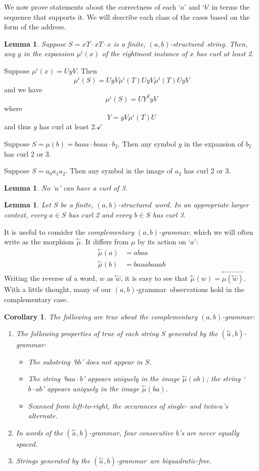 \documentclass[11pt]{article}
\def\emph#1{{\em #1\/}}
\def\term#1{\emph{#1}}
\newcounter{thm}
\newtheorem{corollary}[thm]{Corollary}
\newtheorem{lemma}[thm]{Lemma}
\def\QED{$\checkmark$}
\def\ni{\noindent}
\def\ab{$(a,b)$}
\def\abg{\ab-grammar}
\def\abs{\ab-structured}
\def\la#1{\overset{\leftarrow}{#1}}
\def\lla#1{\overset{\longleftarrow}{#1}}
\def\rmu{\la{\mu}}
\def\rabg{$(\la{a},b)$-grammar}
\def\q#1{`$#1$'}
\def\Proof{\ni{\bf Proof:} }
\begin{document}
We now prove statements about the correctness of each \q{a} and \q{b} in terms
the sequence that supports it.  We will describe each class of the cases
based on the form of the address.

\begin{lemma}\label{lem:curltwo}
Suppose $S=xT\cdot xT\cdot x$ is a finite, \abs\ string.  Then, any $y$ in
the expansion $\mu^i(x)$ of the rightmost instance of $x$ has curl at least 2.
\end{lemma}
\Proof Suppose $\mu^i(x)=UyV$.  Then 
$$\mu^i(S)=UyV\mu^i(T)UyV\mu^i(T)UyV$$
\ni and we have
$$\mu^i(S)=UY^2yV$$
\ni where
$$Y=yV\mu^i(T)U$$
\ni and thus $y$ has curl at least 2.\QED

\ni {\sc Example.}  Suppose $S=\mu(b)=baaa\cdot baaa\cdot b_2$.  Then any symbol
$y$ in the expansion of $b_2$ has curl 2 or 3.

\ni {\sc Example.}  Suppose $S=a_0a_1a_2$.  Then any symbol in the image of $a_2$
has curl 2 or 3.

\begin{lemma}\label{lem:properacurl} No \q{a} can have a curl of 3.
\end{lemma}

\begin{lemma}\label{lem:abcurl}
Let $S$ be a finite, \abs\ word.  In an appropriate larger context, every $a\in S$ has curl 2 and every $b\in S$ has curl 3.
\end{lemma}

It is useful to consider the \term{complementary \abg}, 
which we will often write as the morphism $\rmu$. It differs from $\mu$ by
its action on \q{a}:
\begin{align*}
\rmu(a)&=abaa\\
\rmu(b)&=baaabaaab
\end{align*}
\ni Writing the reverse of a word, $w$ as $\la{w}$, it is easy to see
that $\rmu(w)=\lla{\mu(\la{w})}$.  With a little thought, many of
our \abg\ observations hold in the complementary case.

\begin{corollary}
The following are true about the complementary \abg:
\begin{enumerate}
\item The following properties of true of each string $S$ generated by the
\rabg:
\begin{itemize}
\item The substring \q{bb} does not appear in $S$.
\item The string \q{baa\cdot b} appears uniquely in the image $\rmu(ab)$;
the string \q{b\cdot ab} appears uniquely in the image $\rmu(ba)$.
\item Scanned from left-to-right, the occurances of single- and twin-$a$'s alternate.
\end{itemize}
\item In words of the \rabg, four consecutive $b$'s are never equally spaced.
\item Strings generated by the \rabg\ are biquadratic-free.
\end{enumerate}
\end{corollary}
\end{document}
